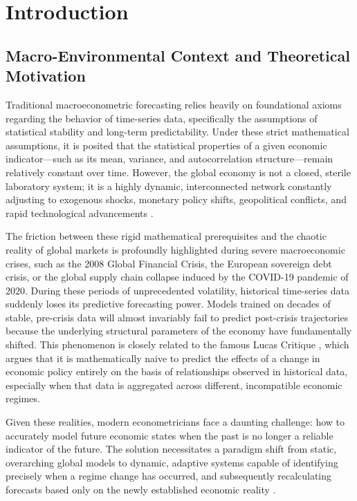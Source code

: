 \chapter{Introduction}
\label{ch:introduction}

\section{Macro-Environmental Context and Theoretical Motivation}
Traditional macroeconometric forecasting relies heavily on foundational axioms regarding the behavior of time-series data, specifically the assumptions of statistical stability and long-term predictability. Under these strict mathematical assumptions, it is posited that the statistical properties of a given economic indicator—such as its mean, variance, and autocorrelation structure—remain relatively constant over time. However, the global economy is not a closed, sterile laboratory system; it is a highly dynamic, interconnected network constantly adjusting to exogenous shocks, monetary policy shifts, geopolitical conflicts, and rapid technological advancements \cite{ClementsHendry1998}. 

The friction between these rigid mathematical prerequisites and the chaotic reality of global markets is profoundly highlighted during severe macroeconomic crises, such as the 2008 Global Financial Crisis, the European sovereign debt crisis, or the global supply chain collapse induced by the COVID-19 pandemic of 2020. During these periods of unprecedented volatility, historical time-series data suddenly loses its predictive forecasting power. Models trained on decades of stable, pre-crisis data will almost invariably fail to predict post-crisis trajectories because the underlying structural parameters of the economy have fundamentally shifted. This phenomenon is closely related to the famous Lucas Critique \cite{Lucas1976}, which argues that it is mathematically naive to predict the effects of a change in economic policy entirely on the basis of relationships observed in historical data, especially when that data is aggregated across different, incompatible economic regimes.

Given these realities, modern econometricians face a daunting challenge: how to accurately model future economic states when the past is no longer a reliable indicator of the future. The solution necessitates a paradigm shift from static, overarching global models to dynamic, adaptive systems capable of identifying precisely when a regime change has occurred, and subsequently recalculating forecasts based only on the newly established economic reality \cite{Pesaran2004}.

